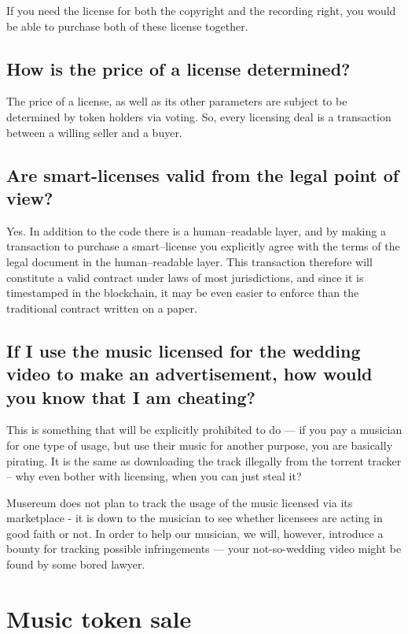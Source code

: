 \documentclass[12pt]{report}
\begin{document}
If you need the license for both the copyright and the recording right,
you would be able to purchase both of these license together.

\section{How is the price of a license determined?}
\label{licenses-price}
The price of a license, as well as its other parameters are subject to be
determined by token holders via voting. So, every licensing deal is a
transaction between a willing seller and a buyer.

\section{Are smart-licenses valid from the legal point of view?}
\label{licenses-legal}
Yes. In addition to the code there is a human–readable layer, and by
making a transaction to purchase a smart–license you explicitly agree
with the terms of the legal document in the human–readable layer.
This transaction therefore will constitute a valid contract under laws
of most jurisdictions, and since it is timestamped in the blockchain,
it may be even easier to enforce than the traditional contract written
on a paper.

\section{If I use the music licensed for the wedding video to make an advertisement, how would you know that I am cheating?}
This is something that will be explicitly prohibited to do — if you pay
a musician for one type of usage, but use their music for another
purpose, you are basically pirating. It is the same as downloading the
track illegally from the torrent tracker – why even bother with
licensing, when you can just steal it?

Musereum does not plan to track the usage of the music licensed via
its marketplace - it is down to the musician to see whether licensees
are acting in good faith or not. In order to help our musician, we will,
however, introduce a bounty for tracking possible infringements —
your not-so-wedding video might be found by some bored lawyer.

\chapter{Music token sale}
\label{ico}
\end{document}
